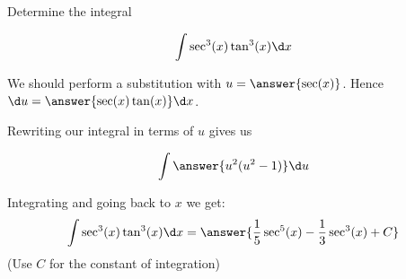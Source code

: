 \documentclass{ximera}
\author{Jason Miller}
\begin{document}
\begin{exercise}
Determine the integral

\[
\int \sec^{3}(x) \tan^{3}(x) \d x
\]

We should perform a substitution with $u=\answer{ \sec(x)}$. Hence $\d u= \answer{ \sec(x)\tan(x)} \d x$. 

\begin{exercise}
Rewriting our integral in terms of $u$ gives us 

\[
\int \answer{u^{2} (u^{2}-1)} \d u
\]
\begin{exercise}
Integrating and going back to $x$ we get:
\[
\int \sec^{3}(x) \tan^{3}(x) \d x= \answer{\frac{1}{5}\sec^5(x) -\frac{ 1}{3} \sec^3(x)+C}
\]
(Use $C$ for the constant of integration)
\end{exercise}
\end{exercise}
\end{exercise}
\end{document}
